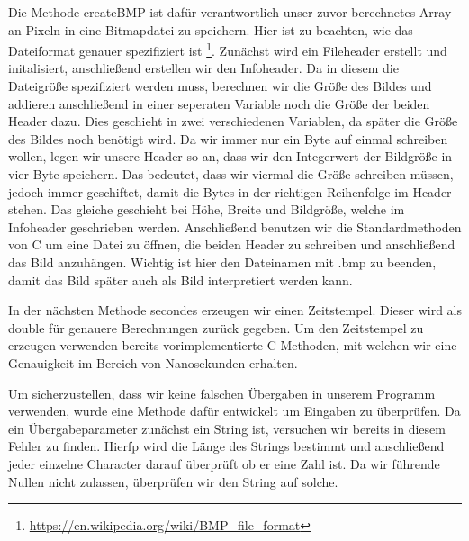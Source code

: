 \documentclass[11pt]{scrartcl}
\begin{document}
Die Methode createBMP ist dafür verantwortlich unser zuvor berechnetes Array an Pixeln in eine Bitmapdatei zu speichern.
Hier ist zu beachten, wie das Dateiformat genauer spezifiziert ist \footnote{\label{not:wikiBMP}\url{https://en.wikipedia.org/wiki/BMP_file_format}}.
Zunächst wird ein Fileheader erstellt und initalisiert, anschließend erstellen wir den Infoheader.
Da in diesem die Dateigröße spezifiziert werden muss, berechnen wir die Größe des Bildes und addieren anschließend in einer seperaten Variable noch die Größe der beiden Header dazu.
Dies geschieht in zwei verschiedenen Variablen, da später die Größe des Bildes noch benötigt wird.
Da wir immer nur ein Byte auf einmal schreiben wollen, legen wir unsere Header so an, dass wir den Integerwert der Bildgröße in vier Byte speichern.
Das bedeutet, dass wir viermal die Größe schreiben müssen, jedoch immer geschiftet, damit die Bytes in der richtigen Reihenfolge im Header stehen.
Das gleiche geschieht bei Höhe, Breite und Bildgröße, welche im Infoheader geschrieben werden.
Anschließend benutzen wir die Standardmethoden von C um eine Datei zu öffnen, die beiden Header zu schreiben und anschließend das Bild anzuhängen.
Wichtig ist hier den Dateinamen mit .bmp zu beenden, damit das Bild später auch als Bild interpretiert werden kann.

In der nächsten Methode secondes erzeugen wir einen Zeitstempel.
Dieser wird als double für genauere Berechnungen zurück gegeben.
Um den Zeitstempel zu erzeugen verwenden bereits vorimplementierte C Methoden, mit welchen wir eine Genauigkeit im Bereich von Nanosekunden erhalten.

Um sicherzustellen, dass wir keine falschen Übergaben in unserem Programm verwenden, wurde eine Methode dafür entwickelt um Eingaben zu überprüfen.
Da ein Übergabeparameter zunächst ein String ist, versuchen wir bereits in diesem Fehler zu finden.
Hierfp wird die Länge des Strings bestimmt und anschließend jeder einzelne Character darauf überprüft ob er eine Zahl ist.
Da wir führende Nullen nicht zulassen, überprüfen wir den String auf solche.
\end{document}
